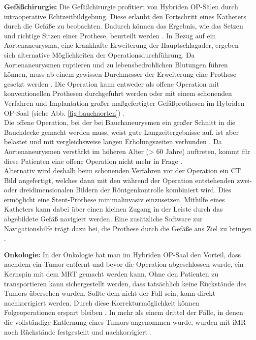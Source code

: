 \textbf{Gefäßchirurgie:}
Die Gefäßchirurgie profitiert von Hybriden OP-Sälen durch intraoperative Echtzeitbildgebung. Diese erlaubt den Fortschritt eines Katheters durch die Gefäße zu beobachten. Dadurch können das Ergebnis, wie das Setzen und richtige Sitzen einer Prothese, beurteilt werden \cite{DresdnerUniklinikum,TickendeBombeImBauch}. In Bezug auf ein Aortenaneurysma, eine krankhafte Erweiterung der Hauptschlagader, ergeben sich alternative Möglichkeiten der Operationsdurchführung. Da Aortenaneurysmen ruptieren und zu lebensbedrohlichen Blutungen führen können, muss ab einem gewissen Durchmesser der Erweiterung eine Prothese gesetzt werden \cite{Aortenaneurysma}. Die Operation kann entweder als offene Operation mit konventionellen Prothesen durchgeführt werden oder mit einem schonenden Verfahren und Implantation großer maßgefertigter Gefäßprothesen im Hybriden OP-Saal (siehe Abb. \ref{fig:bauchaorten}) \cite{DresdnerUniklinikum}. \\
Die offene Operation, bei der bei Bauchaneurysmen ein großer Schnitt in die Bauchdecke gemacht werden muss, weist gute Langzeitergebnisse auf, ist aber belastet und mit vergleichsweise langen Erholungszeiten verbunden \cite{TickendeBombeImBauch}. Da Aortenaneurysmen verstärkt im höheren Alter (> 60 Jahre) auftreten, kommt für diese Patienten eine offene Operation nicht mehr in Frage \cite{Aortenaneurysma}. \\
Alternativ wird deshalb beim schonenden Verfahren vor der Operation ein CT Bild angefertigt, welches dann mit den während der Operation entstehenden zwei- oder dreidimensionalen Bildern der Röntgenkontrolle kombiniert wird. Dies ermöglicht eine Stent-Prothese minimalinvasiv einzusetzen. Mithilfe eines Katheters kann dabei über einen kleinen Zugang in der Leiste durch das abgebildete Gefäß navigiert werden. Eine zusätzliche Software zur Navigationshilfe trägt dazu bei, die Prothese durch die Gefäße ans Ziel zu bringen \cite{DresdnerUniklinikum,TickendeBombeImBauch}.

\textbf{Onkologie:}
In der Onkologie hat man im Hybriden OP-Saal den Vorteil, dass nachdem ein Tumor entfernt und bevor die Operation abgeschlossen wurde, ein Kernspin mit dem MRT gemacht werden kann. Ohne den Patienten zu transportieren kann sichergestellt werden, dass tatsächlich keine Rückstände des Tumors übersehen wurden. Sollte dem nicht der Fall sein, kann direkt nachkorrigiert werden. Durch diese Korrekturmöglichkeit können Folgeoperationen erspart bleiben \cite{AerzteZeitung}. In mehr als einem drittel der Fälle, in denen die vollständige Entfernung eines Tumors angenommen wurde, wurden mit iMR noch Rückstände festgestellt und nachkorrigiert \cite{BrainShiftInTumorResection}.

